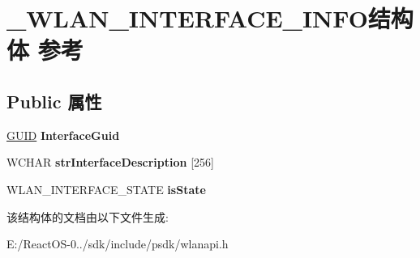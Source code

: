\hypertarget{struct___w_l_a_n___i_n_t_e_r_f_a_c_e___i_n_f_o}{}\section{\+\_\+\+W\+L\+A\+N\+\_\+\+I\+N\+T\+E\+R\+F\+A\+C\+E\+\_\+\+I\+N\+F\+O结构体 参考}
\label{struct___w_l_a_n___i_n_t_e_r_f_a_c_e___i_n_f_o}
\subsection*{Public 属性}
\begin{DoxyCompactItemize}
\item 
\mbox{\label{struct___w_l_a_n___i_n_t_e_r_f_a_c_e___i_n_f_o_a4ef086d7d633d01d77161ed6ce314be3}} 
\hyperlink{interface_g_u_i_d}{G\+U\+ID} {\bfseries Interface\+Guid}
\item 
\mbox{\label{struct___w_l_a_n___i_n_t_e_r_f_a_c_e___i_n_f_o_a38c2b5d82eaa96c7121e7eac0403f026}} 
W\+C\+H\+AR {\bfseries str\+Interface\+Description} \mbox{[}256\mbox{]}
\item 
\mbox{\label{struct___w_l_a_n___i_n_t_e_r_f_a_c_e___i_n_f_o_a5889925e0776b3bd47f49f646a4c0adc}} 
W\+L\+A\+N\+\_\+\+I\+N\+T\+E\+R\+F\+A\+C\+E\+\_\+\+S\+T\+A\+TE {\bfseries is\+State}
\end{DoxyCompactItemize}


该结构体的文档由以下文件生成\+:\begin{DoxyCompactItemize}
\item 
E\+:/\+React\+O\+S-\/0../sdk/include/psdk/wlanapi.\+h\end{DoxyCompactItemize}
